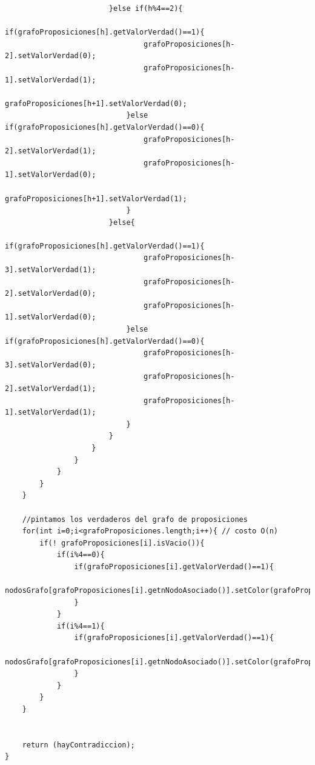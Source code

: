 \documentclass[a4paper]{article}
\begin{document}
\begin{lstlisting}
						}else if(h%4==2){
							if(grafoProposiciones[h].getValorVerdad()==1){
								grafoProposiciones[h-2].setValorVerdad(0);
								grafoProposiciones[h-1].setValorVerdad(1);
								grafoProposiciones[h+1].setValorVerdad(0);
							}else if(grafoProposiciones[h].getValorVerdad()==0){
								grafoProposiciones[h-2].setValorVerdad(1);
								grafoProposiciones[h-1].setValorVerdad(0);
								grafoProposiciones[h+1].setValorVerdad(1);
							}
						}else{
							if(grafoProposiciones[h].getValorVerdad()==1){
								grafoProposiciones[h-3].setValorVerdad(1);
								grafoProposiciones[h-2].setValorVerdad(0);
								grafoProposiciones[h-1].setValorVerdad(0);
							}else if(grafoProposiciones[h].getValorVerdad()==0){
								grafoProposiciones[h-3].setValorVerdad(0);
								grafoProposiciones[h-2].setValorVerdad(1);
								grafoProposiciones[h-1].setValorVerdad(1);
							}
						}
					}
				}
			}
		}
	}

	//pintamos los verdaderos del grafo de proposiciones
	for(int i=0;i<grafoProposiciones.length;i++){ // costo O(n)
		if(! grafoProposiciones[i].isVacio()){
			if(i%4==0){
				if(grafoProposiciones[i].getValorVerdad()==1){
					nodosGrafo[grafoProposiciones[i].getnNodoAsociado()].setColor(grafoProposiciones[i].getColorAsociado());
				}
			}
			if(i%4==1){
				if(grafoProposiciones[i].getValorVerdad()==1){
					nodosGrafo[grafoProposiciones[i].getnNodoAsociado()].setColor(grafoProposiciones[i].getColorAsociado());
				}
			}
		}
	}
	

	return (hayContradiccion);
}
	
\end{lstlisting}
\end{document}
